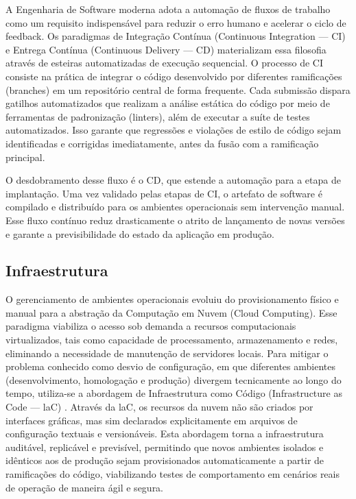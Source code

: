 \documentclass[article,a4paper,12pt,brazil,sumario=tradicional]{abntex2}
\begin{document}
A Engenharia de Software moderna adota a automação de fluxos de trabalho como um requisito indispensável para reduzir o erro humano e acelerar o ciclo de feedback. Os paradigmas de Integração Contínua (Continuous Integration — CI) e Entrega Contínua (Continuous Delivery — CD) \cite{humble2010continuous} materializam essa filosofia através de esteiras automatizadas de execução sequencial. O processo de CI consiste na prática de integrar o código desenvolvido por diferentes ramificações (branches) em um repositório central de forma frequente. Cada submissão dispara gatilhos automatizados que realizam a análise estática do código por meio de ferramentas de padronização (linters), além de executar a suíte de testes automatizados. Isso garante que regressões e violações de estilo de código sejam identificadas e corrigidas imediatamente, antes da fusão com a ramificação principal.

O desdobramento desse fluxo é o CD, que estende a automação para a etapa de implantação. Uma vez validado pelas etapas de CI, o artefato de software é compilado e distribuído para os ambientes operacionais sem intervenção manual. Esse fluxo contínuo reduz drasticamente o atrito de lançamento de novas versões e garante a previsibilidade do estado da aplicação em produção.

\subsection{Infraestrutura}

O gerenciamento de ambientes operacionais evoluiu do provisionamento físico e manual para a abstração da Computação em Nuvem (Cloud Computing). Esse paradigma \cite{nist2011cloud} viabiliza o acesso sob demanda a recursos computacionais virtualizados, tais como capacidade de processamento, armazenamento e redes, eliminando a necessidade de manutenção de servidores locais. Para mitigar o problema conhecido como desvio de configuração, em que diferentes ambientes (desenvolvimento, homologação e produção) divergem tecnicamente ao longo do tempo, utiliza-se a abordagem de Infraestrutura como Código (Infrastructure as Code — laC) \cite{morris2020iac}. Através da laC, os recursos da nuvem não são criados por interfaces gráficas, mas sim declarados explicitamente em arquivos de configuração textuais e versionáveis. Esta abordagem torna a infraestrutura auditável, replicável e previsível, permitindo que novos ambientes isolados e idênticos aos de produção sejam provisionados automaticamente a partir de ramificações do código, viabilizando testes de comportamento em cenários reais de operação de maneira ágil e segura.
\end{document}
